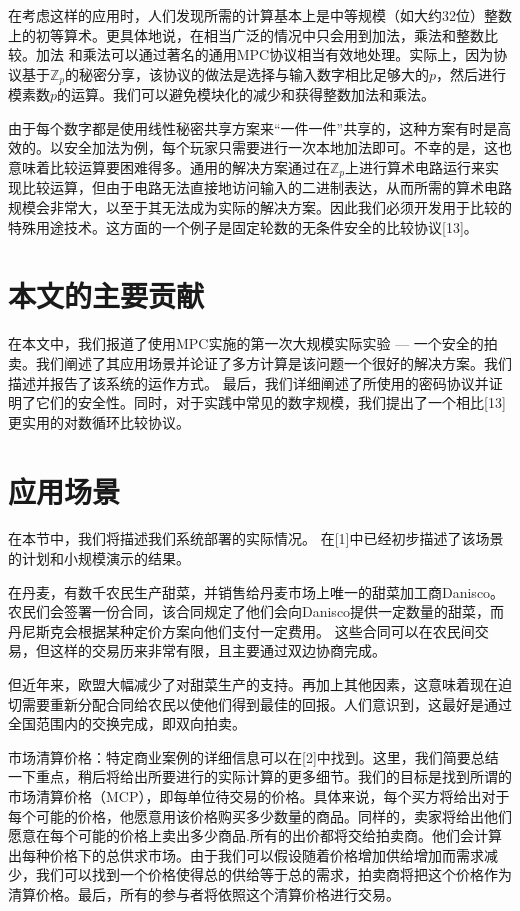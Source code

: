 在考虑这样的应用时，人们发现所需的计算基本上是中等规模（如大约32位）整数上的初等算术。更具体地说，在相当广泛的情况中只会用到加法，乘法和整数比较。加法
和乘法可以通过著名的通用MPC协议相当有效地处理。实际上，因为协议基于$\mathbb{Z}_p$的秘密分享，该协议的做法是选择与输入数字相比足够大的$p$，然后进行模素数$p$的运算。我们可以避免模块化的减少和获得整数加法和乘法。

由于每个数字都是使用线性秘密共享方案来“一件一件”共享的，这种方案有时是高效的。以安全加法为例，每个玩家只需要进行一次本地加法即可。不幸的是，这也意味着比较运算要困难得多。通用的解决方案通过在$\mathbb{Z}_p$上进行算术电路运行来实现比较运算，但由于电路无法直接地访问输入的二进制表达，从而所需的算术电路规模会非常大，以至于其无法成为实际的解决方案。因此我们必须开发用于比较的特殊用途技术。这方面的一个例子是固定轮数的无条件安全的比较协议[13]。

\section{本文的主要贡献}
在本文中，我们报道了使用MPC实施的第一次大规模实际实验 --- 一个安全的拍卖。我们阐述了其应用场景并论证了多方计算是该问题一个很好的解决方案。我们描述并报告了该系统的运作方式。 最后，我们详细阐述了所使用的密码协议并证明了它们的安全性。同时，对于实践中常见的数字规模，我们提出了一个相比[13]更实用的对数循环比较协议。

\section{应用场景}
在本节中，我们将描述我们系统部署的实际情况。 在[1]中已经初步描述了该场景的计划和小规模演示的结果。

在丹麦，有数千农民生产甜菜，并销售给丹麦市场上唯一的甜菜加工商Danisco。农民们会签署一份合同，该合同规定了他们会向Danisco提供一定数量的甜菜，而丹尼斯克会根据某种定价方案向他们支付一定费用。 这些合同可以在农民间交易，但这样的交易历来非常有限，且主要通过双边协商完成。

但近年来，欧盟大幅减少了对甜菜生产的支持。再加上其他因素，这意味着现在迫切需要重新分配合同给农民以使他们得到最佳的回报。人们意识到，这最好是通过全国范围内的交换完成，即双向拍卖。

市场清算价格：特定商业案例的详细信息可以在[2]中找到。这里，我们简要总结一下重点，稍后将给出所要进行的实际计算的更多细节。我们的目标是找到所谓的市场清算价格（MCP），即每单位待交易的价格。具体来说，每个买方将给出对于每个可能的价格，他愿意用该价格购买多少数量的商品。同样的，卖家将给出他们愿意在每个可能的价格上卖出多少商品.所有的出价都将交给拍卖商。他们会计算出每种价格下的总供求市场。由于我们可以假设随着价格增加供给增加而需求减少，我们可以找到一个价格使得总的供给等于总的需求，拍卖商将把这个价格作为清算价格。最后，所有的参与者将依照这个清算价格进行交易。

